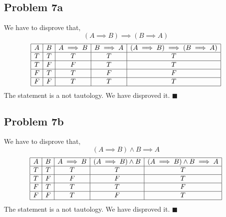 \documentclass[answers]{exam}
\theoremstyle{mytheoremstyle}
\theoremstyle{mytheoremstyle}
\theoremstyle{myproblemstyle}
\begin{document}
\subsection*{Problem 7a}
\begin{framed}
    We have to disprove that,
    \[(A\implies B)\implies (B\implies A)\]
    \begin{displaymath}
        \begin{array}{|c|c|c|c|c|c|}
            \hline
            A & B & A\implies B & B\implies A & (A\implies B)\implies (B\implies A) \\\hline
            T & T & T           & T           & T                                   \\\hline
            T & F & F           & T           & T                                   \\\hline
            F & T & T           & F           & F                                   \\\hline
            F & F & T           & T           & T                                   \\\hline
        \end{array}
    \end{displaymath}
    The statement is a not tautology. We have disproved it. \(\blacksquare\)
\end{framed}

\subsection*{Problem 7b}
\begin{framed}
    We have to disprove that,
    \[(A\implies B) \land B\implies A\]
    \begin{displaymath}
        \begin{array}{|c|c|c|c|c|c|}
            \hline
            A & B & A\implies B & (A\implies B)\land B & (A\implies B) \land B\implies A \\\hline
            T & T & T           & T                    & T                               \\\hline
            T & F & F           & F                    & T                               \\\hline
            F & T & T           & T                    & F                               \\\hline
            F & F & T           & F                    & T                               \\\hline
        \end{array}
    \end{displaymath}
    The statement is a not tautology. We have disproved it. \(\blacksquare\)
\end{framed}
\end{document}
